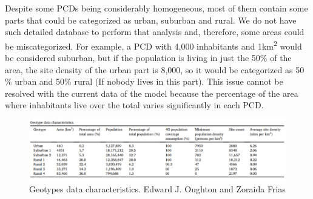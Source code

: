 Despite some PCDs being considerably homogeneous, most of them contain some parts that could be categorized as urban, suburban and rural. We do not have such detailed database to perform that analysis and, therefore, some areas could be miscategorized. For example, a PCD with 4,000 inhabitants and 1km\textsuperscript{2} would be considered suburban, but if the population is living in just the 50$\%$  of the area, the site density of the urban part is 8,000, so it would be categorized as 50$\%$  urban and 50$\%$  rural (If nobody lives in this part). This issue cannot be resolved with the current data of the model because the percentage of the area where inhabitants live over the total varies significantly in each PCD.
\begin{figure}[H]
	\begin{Center}
		\includegraphics[width=1.1\textwidth]{./media/image17.png}
		\caption{Geotypes data characteristics. Edward J. Oughton and Zoraida Frias\cite{3-03}}
	\end{Center}
\end{figure}
